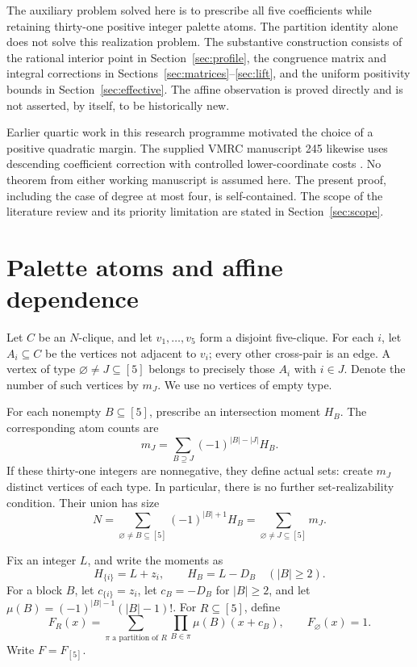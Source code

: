 \documentclass[11pt,a4paper]{article}
\theoremstyle{definition}
\begin{document}
The auxiliary problem solved here is to prescribe all five coefficients
while retaining thirty-one positive integer palette atoms. The partition
identity alone does not solve this realization problem. The substantive
construction consists of the rational interior point in
Section~\ref{sec:profile}, the congruence matrix and integral corrections in
Sections~\ref{sec:matrices}--\ref{sec:lift}, and the uniform positivity
bounds in Section~\ref{sec:effective}. The affine observation is proved
directly and is not asserted, by itself, to be historically new.

Earlier quartic work in this research programme motivated the choice of a
positive quadratic margin. The supplied VMRC manuscript 245 likewise uses
descending coefficient correction with controlled lower-coordinate costs
\cite[Sections 2--3]{VMRC}. No theorem from either working manuscript is
assumed here. The present proof, including the case of degree at most four,
is self-contained. The scope of the literature review and its priority
limitation are stated in Section~\ref{sec:scope}.

\section{Palette atoms and affine dependence}\label{sec:palettes}

Let $C$ be an $N$-clique, and let $v_1,\ldots,v_5$ form a disjoint
five-clique. For each $i$, let $A_i\subseteq C$ be the vertices not
adjacent to $v_i$; every other cross-pair is an edge.
A vertex of type $\varnothing\ne J\subseteq[5]$ belongs to precisely
those $A_i$ with $i\in J$. Denote the number of such vertices by $m_J$.
We use no vertices of empty type.

For each nonempty $B\subseteq[5]$, prescribe an intersection moment $H_B$.
The corresponding atom counts are
\begin{equation}\label{eq:mobius}
 m_J=\sum_{B\supseteq J}(-1)^{|B|-|J|}H_B.
\end{equation}
If these thirty-one integers are nonnegative, they define actual sets:
create $m_J$ distinct vertices of each type. In particular, there is no
further set-realizability condition. Their union has size
\begin{equation}\label{eq:N}
 N=\sum_{\varnothing\ne B\subseteq[5]}(-1)^{|B|+1}H_B
   =\sum_{\varnothing\ne J\subseteq[5]}m_J.
\end{equation}

Fix an integer $L$, and write the moments as
\begin{equation}\label{eq:momentparams}
 H_{\{i\}}=L+z_i,\qquad H_B=L-D_B\quad (|B|\ge2).
\end{equation}
For a block $B$, let $c_{\{i\}}=z_i$, let $c_B=-D_B$ for $|B|\ge2$,
and let $\mu(B)=(-1)^{|B|-1}(|B|-1)!$.
For $R\subseteq[5]$, define
\begin{equation}\label{eq:FR}
 F_R(x)=\sum_{\pi\text{ a partition of }R}
          \prod_{B\in\pi}\mu(B)(x+c_B),\qquad F_\varnothing(x)=1.
\end{equation}
Write $F=F_{[5]}$.
\end{document}
